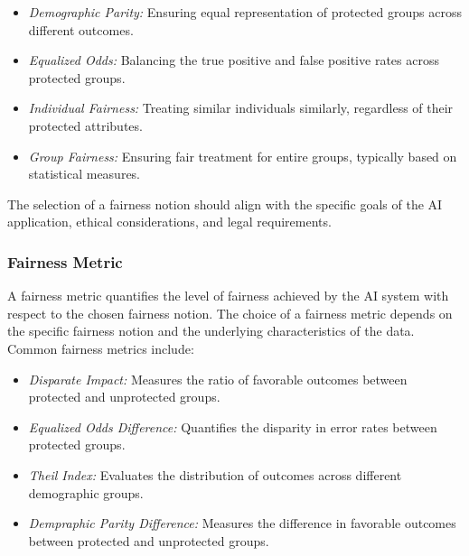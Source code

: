 \begin{itemize}
  
    \item \emph{Demographic Parity:} Ensuring equal representation of protected groups across different outcomes.
  
    \item \emph{Equalized Odds:} Balancing the true positive and false positive rates across protected groups.
  
    \item \emph{Individual Fairness:} Treating similar individuals similarly, regardless of their protected attributes.
   
    \item \emph{Group Fairness:} Ensuring fair treatment for entire groups, typically based on statistical measures.

\end{itemize}

The selection of a fairness notion should align with the specific goals of the AI application, ethical considerations, and legal requirements.

\subsubsection{Fairness Metric}

A fairness metric quantifies the level of fairness achieved by the AI system with respect to the chosen fairness notion. The choice of a fairness metric depends on the specific fairness notion and the underlying characteristics of the data. Common fairness metrics include:

\begin{itemize}
   
    \item \emph{Disparate Impact:} Measures the ratio of favorable outcomes between protected and unprotected groups.
   
    \item \emph{Equalized Odds Difference:} Quantifies the disparity in error rates between protected groups.
   
    \item \emph{Theil Index:} Evaluates the distribution of outcomes across different demographic groups.
   
    \item \emph{Dempraphic Parity Difference:} Measures the difference in favorable outcomes between protected and unprotected groups.

\end{itemize}

